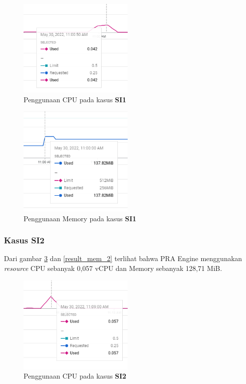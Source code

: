 \begin{figure}[!htb]
	\centering
	\includegraphics[width=0.5\textwidth]{resources/ch4/resource/1-cpu.png}
	\caption{Penggunaan CPU pada kasus \textbf{SI1}}
	\label{result_cpu_1}
\end{figure}

\begin{figure}[!htb]
	\centering
	\includegraphics[width=0.5\textwidth]{resources/ch4/resource/1-mem.png}
	\caption{Penggunaan Memory pada kasus \textbf{SI1}}
	\label{result_mem_1}
\end{figure}

\pagebreak

\subsubsection{Kasus SI2}
Dari gambar \ref{result_cpu_2} dan \ref{result_mem_2} terlihat bahwa PRA Engine menggunakan \textit{resource} CPU sebanyak 0,057 vCPU dan Memory sebanyak 128,71 MiB. 

\begin{figure}[!htb]
	\centering
	\includegraphics[width=0.5\textwidth]{resources/ch4/resource/2-cpu.png}
	\caption{Penggunaan CPU pada kasus \textbf{SI2}}
	\label{result_cpu_2}
\end{figure}


